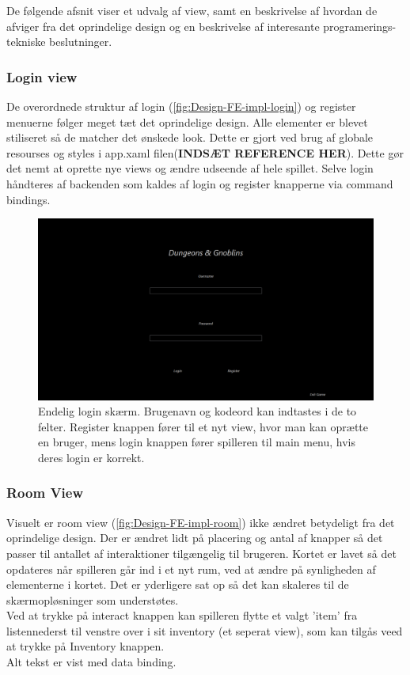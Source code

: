 \noindent De følgende afsnit viser et udvalg af view, samt en beskrivelse af hvordan de afviger fra det oprindelige design og en beskrivelse af interesante programerings-tekniske beslutninger.

\subsubsection{Login view}
De overordnede struktur af login (\autoref{fig:Design-FE-impl-login}) og register menuerne følger meget tæt det oprindelige design. Alle elementer er blevet stiliseret så de matcher det ønskede look. Dette er gjort ved brug af globale resourses og styles i app.xaml filen(\textbf{INDSÆT REFERENCE HER}). Dette gør det nemt at oprette nye views og ændre udseende af hele spillet. Selve login håndteres af backenden som kaldes af login og register knapperne via command bindings.

\begin{figure}[H]
\centering
\includegraphics[width = \textwidth]{02-Body/Images/login_final.PNG}
\caption{Endelig login skærm. Brugenavn og kodeord kan indtastes i de to felter. Register knappen fører til et nyt view, hvor man kan oprætte en bruger, mens login knappen fører spilleren til main menu, hvis deres login er korrekt.}
\label{fig:Design-FE-impl-login}
\end{figure}

\subsubsection{Room View}

Visuelt er room view (\autoref{fig:Design-FE-impl-room}) ikke ændret betydeligt fra det oprindelige design. Der er ændret lidt på placering og antal af knapper så det passer til antallet af interaktioner tilgængelig til brugeren. Kortet er lavet så det  opdateres når spilleren går ind i et nyt rum, ved at ændre på synligheden af elementerne i kortet. Det er yderligere sat op så det kan skaleres til de skærmopløsninger som understøtes.\\
Ved at trykke på interact knappen kan spilleren flytte et valgt 'item' fra listennederst til venstre over i sit inventory (et seperat view), som kan tilgås veed at trykke på Inventory knappen.\\
Alt tekst er vist med data binding.

